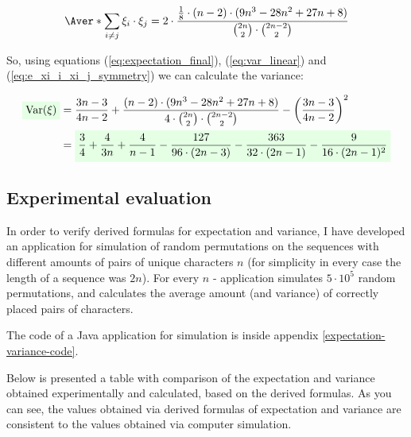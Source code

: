 \documentclass{article}
\newcommand{\highlight}[1]{\colorbox{green!10}{$\displaystyle#1$}}
\newcommand{\Var}{\mathrm{Var}}
\begin{document}
\begin{equation}
	\Aver*{\sum_{i \neq j}\xi_i \cdot \xi_j} = 2 \cdot {{1 \over 8} \cdot (n-2) \cdot (9n^3 - 28n^2 + 27n + 8) \over {2n \choose 2} \cdot {2n - 2 \choose 2}}
\end{equation}

So, using equations (\ref{eq:expectation_final}), (\ref{eq:var_linear}) and (\ref{eq:e_xi_i_xi_j_symmetry}) we can calculate the variance:

\begin{equation}
\begin{split}
	\highlight{\Var(\xi)} & = {3n-3 \over 4n-2} + {(n - 2) \cdot (9n^3 - 28n^2 + 27n + 8) \over 4 \cdot {2n \choose 2} \cdot {2n - 2 \choose 2}} - \left({3n-3 \over 4n-2}\right)^2 \\
		     & = \highlight{{3 \over 4} + {4 \over 3n} + {4 \over n - 1} - {127 \over 96 \cdot (2n - 3)} - {363 \over 32 \cdot (2n - 1)} - {9 \over 16 \cdot (2n - 1)^2}}
\end{split}
\end{equation}

\subsection{Experimental evaluation} \label{experimental-evaluation}

In order to verify derived formulas for expectation and variance, I have developed an application for simulation of random permutations on the sequences with different amounts of pairs of unique characters $n$ (for simplicity in every case the length of a sequence was $2n$). For every $n$ - application simulates $5 \cdot 10^5$ random permutations, and calculates the average amount (and variance) of correctly placed pairs of characters.  

The code of a Java application for simulation is inside appendix \ref{expectation-variance-code}.

Below is presented a table with comparison of the expectation and variance obtained experimentally and calculated, based on the derived formulas. As you can see, the values obtained via derived formulas of expectation and variance are consistent to the values obtained via computer simulation.
\end{document}
